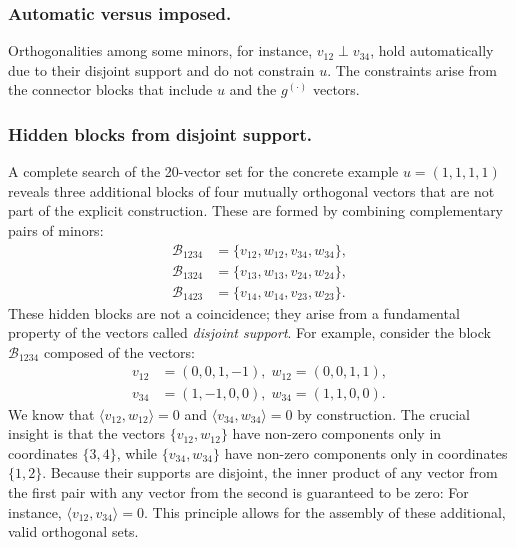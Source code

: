 \documentclass[%
  reprint,
  superscriptaddress,
  showpacs,
  showkeys,
  amsmath,amssymb,
  pra,
  longbibliography,
  floatfix,
  x11names
]{revtex4-2}
\begin{document}
\subsubsection{Automatic versus imposed.}
Orthogonalities among some minors, for instance, $v_{12}\perp v_{34}$, hold automatically due to their disjoint support and do not constrain $u$. The constraints arise from the connector blocks that include $u$ and the $g^{(\cdot)}$ vectors.

\subsubsection{Hidden blocks from disjoint support.}
A complete search of the 20-vector set for the concrete example $u=(1,1,1,1)$ reveals three additional blocks of four mutually orthogonal vectors that are not part of the explicit construction. These are formed by combining complementary pairs of minors:
\begin{align*}
     \mathcal{B}_{1234} &= \{v_{12}, w_{12}, v_{34}, w_{34}\},\\
     \mathcal{B}_{1324}  &=   \{v_{13}, w_{13}, v_{24}, w_{24}\},\\
     \mathcal{B}_{1423}  &=   \{v_{14}, w_{14}, v_{23}, w_{23}\}.
\end{align*}
These hidden blocks are not a coincidence; they arise from a fundamental property of the vectors called \emph{disjoint support}.
For example, consider the block $\mathcal{B}_{1234}$ composed of the vectors:
\begin{align*}
v_{12}&=(0,0,1,-1),\;
w_{12} =(0,0,1,1),\\
v_{34}&=(1,-1,0,0),\;
w_{34} =(1,1,0,0).
\end{align*}
We know that $\langle v_{12}, w_{12} \rangle=0$ and $\langle v_{34}, w_{34} \rangle=0$ by construction.
The crucial insight is that the vectors $\{v_{12}, w_{12}\}$ have non-zero components only in coordinates $\{3,4\}$,
while $\{v_{34}, w_{34}\}$ have non-zero components only in coordinates $\{1,2\}$.
Because their supports are disjoint, the inner product of any vector from the first pair with any vector from the second is guaranteed to be zero:
For instance, $\langle v_{12}, v_{34} \rangle = 0$.
This principle allows for the assembly of these additional, valid orthogonal sets.
\end{document}

